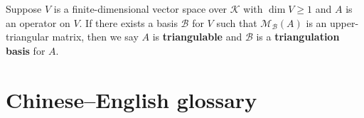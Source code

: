 \documentclass{ctexart}
\begin{document}
    \begin{mydef}
        Suppose $V$ is a finite-dimensional vector space over $\mathcal K$ with $\dim V\ge 1$ and $A$ is an operator on $V$. If there exists a basis $\mathcal{B}$ for $V$ such that $\mathcal M_\mathcal{B}(A)$ is an upper-triangular matrix, then we say $A$ is \textbf{triangulable} and $\mathcal{B}$ is a \textbf{triangulation basis} for $A$.
    \end{mydef}
    \begin{mythm}
        
    \end{mythm}

	\newpage

	\appendix


	\section{Chinese–English glossary}
\end{document}
